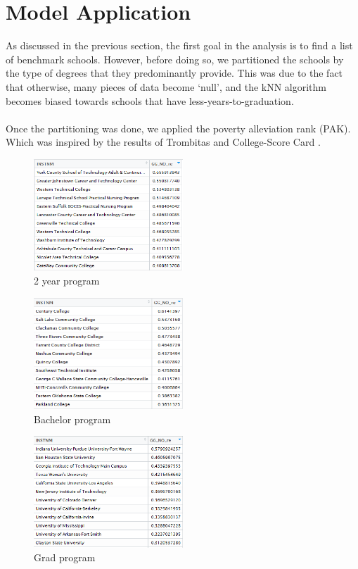 \documentclass[12pt]{scrartcl}
\begin{document}
\section{Model Application} 
	As discussed in the previous section, the first goal in the analysis is to find a list of benchmark schools. However, before doing so, we partitioned the schools by the type of degrees that they predominantly provide. This was due to the fact that otherwise, many pieces of data become `null', and the kNN algorithm becomes biased towards schools that have less-years-to-graduation.\\ 
	\\
	Once the partitioning was done, we applied the poverty alleviation rank (PAK). Which was inspired by the results of Trombitas \cite{Trom} and College-Score Card \cite{US}.\\
	\begin{figure}[h]
		\centering
		\includegraphics[width=0.5\textwidth]{2yr-col.png}
		\caption{2 year program}
		\label{fig:prog2}
	\end{figure}
	\begin{figure}[h]
		\centering
		\includegraphics[width=0.5\textwidth]{4yr-col.png}
		\caption{Bachelor program}
		\label{fig:prog4}
	\end{figure}
	\begin{figure}[h]
		\centering
		\includegraphics[width=0.5\textwidth]{6yr-col.png}
		\caption{Grad program}
		\label{fig:prog2}
	\end{figure}
\end{document}
